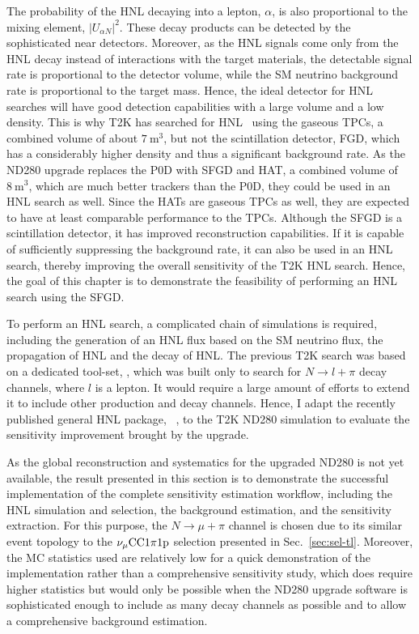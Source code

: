         The probability of the HNL decaying into a lepton, $\alpha$, is also proportional to the mixing element, $|U_{\alpha N}|^2$.
        These decay products can be detected by the sophisticated near detectors.
        Moreover, as the HNL signals come only from the HNL decay instead of interactions with the target materials, the detectable signal rate is proportional to the detector volume, while the SM neutrino background rate is proportional to the target mass.
        Hence, the ideal detector for HNL searches will have good detection capabilities with a large volume and a low density. 
        This is why T2K has searched for HNL~\cite{T2K:2019jwa} using the gaseous TPCs, a combined volume of about $7~\textrm{m}^3$, but not the scintillation detector, FGD, which has a considerably higher density and thus a significant background rate.
        As the ND280 upgrade replaces the P0D with SFGD and HAT, a combined volume of $8~\textrm{m}^3$, which are much better trackers than the P0D, they could be used in an HNL search as well.
        Since the HATs are gaseous TPCs as well, they are expected to have at least comparable performance to the TPCs. 
        Although the SFGD is a scintillation detector, it has improved reconstruction capabilities. 
        If it is capable of sufficiently suppressing the background rate, it can also be used in an HNL search, thereby improving the overall sensitivity of the T2K HNL search.
        Hence, the goal of this chapter is to demonstrate the feasibility of performing an HNL search using the SFGD.

        To perform an HNL search, a complicated chain of simulations is required, including the generation of an HNL flux based on the SM neutrino flux, the propagation of HNL and the decay of HNL. 
        The previous T2K search was based on a dedicated tool-set, , which was built only to search for $N\rightarrow l + \pi$ decay channels, where $l$ is a lepton. 
        It would require a large amount of efforts to extend it to include other production and decay channels. 
        Hence, I adapt the recently published general HNL package, ~\cite{Plows:2022gxc}, to the T2K ND280 simulation to evaluate the sensitivity improvement brought by the upgrade.

        As the global reconstruction and systematics for the upgraded ND280 is not yet available, the result presented in this section is to demonstrate the successful implementation of the complete sensitivity estimation workflow, including the HNL simulation and selection, the background estimation, and the sensitivity extraction. 
        For this purpose, the $N\rightarrow\mu+\pi$ channel is chosen due to its similar event topology to the $\nu_{\mu}\textrm{CC}1\pi1\textrm{p}$ selection presented in Sec.~\ref{sec:sel-tl}.
        Moreover, the MC statistics used are relatively low for a quick demonstration of the implementation rather than a comprehensive sensitivity study, which does require higher statistics but would only be possible when the ND280 upgrade software is sophisticated enough to include as many decay channels as possible and to allow a comprehensive background estimation.

